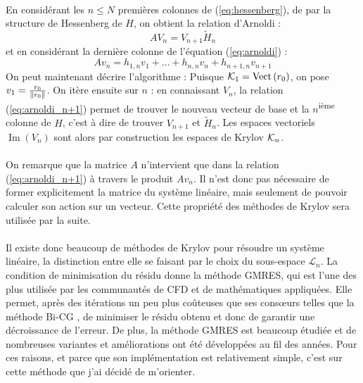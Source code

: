 		\paragraph{}
		En considérant les $n \le N$ premières colonnes de (\ref{eq:hessenberg}), de par la structure de Hessenberg de $H$, on obtient la relation d'Arnoldi :
		\begin{equation}\label{eq:arnoldi}
			AV_n = V_{n+1}\widetilde{H}_n
		\end{equation}
		et en considérant la dernière colonne de l'équation (\ref{eq:arnoldi}) :
		\begin{equation}\label{eq:arnoldi_n+1}
			Av_n = h_{1,n}v_1 + \dots + h_{n,n}v_n + h_{n+1,n}v_{n+1}
		\end{equation}
		On peut maintenant décrire l'algorithme :
		Puisque $\krylov{1} = \operatorname{Vect}\left(r_0\right)$, on pose $v_1 = \frac{r_0}{\norm{r_0}}$.
		On itère ensuite sur $n$ : en connaissant $V_n$, la relation (\ref{eq:arnoldi_n+1}) permet de trouver le nouveau vecteur de base et la $n$\textsuperscript{ième} colonne de $H$, c'est à dire de trouver $V_{n+1}$ et $\widetilde{H}_n$.
		Les espaces vectoriels $\operatorname{Im}\left(V_n\right)$ sont alors par construction les espaces de Krylov $\krylov{n}$.

		\paragraph{}
		On remarque que la matrice $A$ n'intervient que dans la relation (\ref{eq:arnoldi_n+1}) à travers le produit $Av_n$.
		Il n'est donc pas nécessaire de former explicitement la matrice du système linéaire, mais seulement de pouvoir calculer son action sur un vecteur.
		Cette propriété des méthodes de Krylov sera utilisée par la suite.

		\paragraph{}
		Il existe donc beaucoup de méthodes de Krylov pour résoudre un système linéaire, la distinction entre elle se faisant par le choix du sous-espace $\mathcal{L}_n$.
		La condition de minimisation du résidu donne la méthode GMRES, qui est l'une des plus utilisée par les communautés de CFD et de mathématiques appliquées.
		Elle permet, après des itérations un peu plus coûteuses que ses consœurs telles que la méthode Bi-CG \cite{TrefethenBau1997}, de minimiser le résidu obtenu et donc de garantir une décroissance de l'erreur.
		De plus, la méthode GMRES est beaucoup étudiée et de nombreuses variantes et améliorations ont été développées au fil des années.
		Pour ces raisons, et parce que son implémentation est relativement simple, c'est sur cette méthode que j'ai décidé de m'orienter.


